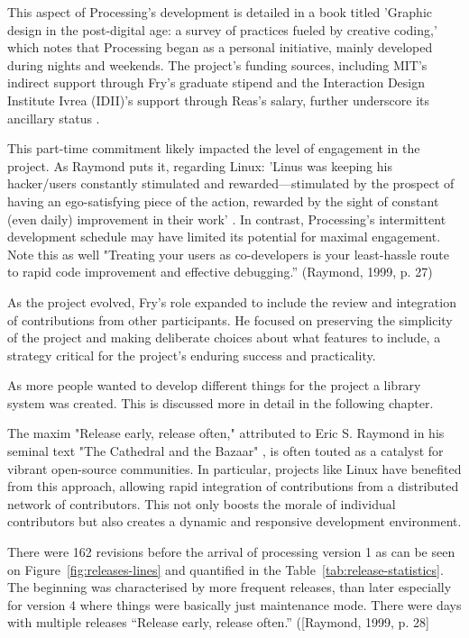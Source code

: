 This aspect of Processing's development is detailed in a book titled 'Graphic design in the post-digital age: a survey of practices fueled by creative coding,' which notes that Processing began as a personal initiative, mainly developed during nights and weekends. The project's funding sources, including MIT's indirect support through Fry's graduate stipend and the Interaction Design Institute Ivrea (IDII)'s support through Reas's salary, further underscore its ancillary status \parencite[396]{conradGraphicDesignPostdigital2021}.

This part-time commitment likely impacted the level of engagement in the project. As Raymond puts it, regarding Linux: 'Linus was keeping his hacker/users constantly stimulated and rewarded—stimulated by the prospect of having an ego-satisfying piece of the action, rewarded by the sight of constant (even daily) improvement in their work' \parencite[28]{raymondCathedralBazaar1999}. In contrast, Processing's intermittent development schedule may have limited its potential for maximal engagement.
Note this as well "Treating your users as co-developers is your least-hassle route to rapid code improvement and effective debugging.” (Raymond, 1999, p. 27)

As the project evolved, Fry's role expanded to include the review and integration of contributions from other participants. He focused on preserving the simplicity of the project and making deliberate choices about what features to include, a strategy critical for the project's enduring success and practicality. \parencite{Processing4CONTRIBUTINGMd}

As more people wanted to develop different things for the project a library system was created. This is discussed more in detail in the following chapter. 

The maxim "Release early, release often," attributed to Eric S. Raymond in his seminal text "The Cathedral and the Bazaar" \parencite{raymondCathedralBazaar1999}, is often touted as a catalyst for vibrant open-source communities. In particular, projects like Linux have benefited from this approach, allowing rapid integration of contributions from a distributed network of contributors. This not only boosts the morale of individual contributors but also creates a dynamic and responsive development environment.

There were 162 revisions before the arrival of processing version 1 as can be seen on Figure~\ref{fig:releases-lines} and quantified in the Table~\ref{tab:release-statistics}. The beginning was characterised by more frequent releases, than later especially for version 4 where things were basically just maintenance mode. There were days with multiple releases “Release early, release often.” ([Raymond, 1999, p. 28]

